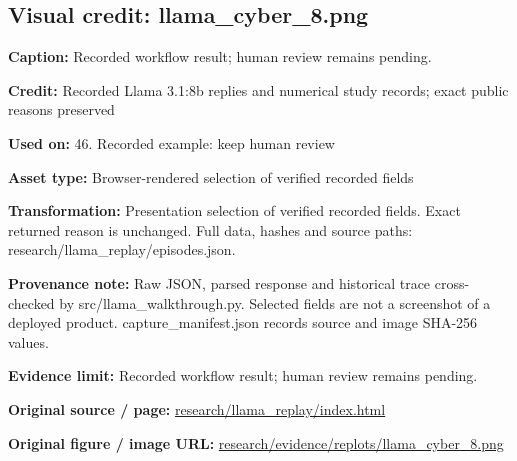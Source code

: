 \documentclass[10pt,letterpaper]{article}
\begin{document}
\subsection*{Visual credit: llama\_cyber\_8.png}
\textbf{Caption:} Recorded workflow result; human review remains pending.\par
\textbf{Credit:} Recorded Llama 3.1:8b replies and numerical study records; exact public reasons preserved\par
\textbf{Used on:} 46. Recorded example: keep human review\par
\textbf{Asset type:} Browser-rendered selection of verified recorded fields\par
\textbf{Transformation:} Presentation selection of verified recorded fields. Exact returned reason is unchanged. Full data, hashes and source paths: research/llama\_replay/episodes.json.\par
\textbf{Provenance note:} Raw JSON, parsed response and historical trace cross-checked by src/llama\_walkthrough.py. Selected fields are not a screenshot of a deployed product. capture\_manifest.json records source and image SHA-256 values.\par
\textbf{Evidence limit:} Recorded workflow result; human review remains pending.\par
\textbf{Original source / page:} \href{../research/llama_replay/index.html}{\small\ttfamily research/\allowbreak{}llama\_\allowbreak{}replay/\allowbreak{}index.\allowbreak{}html}\par
\textbf{Original figure / image URL:} \href{../research/evidence/replots/llama_cyber_8.png}{\small\ttfamily research/\allowbreak{}evidence/\allowbreak{}replots/\allowbreak{}llama\_\allowbreak{}cyber\_\allowbreak{}8.\allowbreak{}png}\par
\par\medskip
\end{document}
